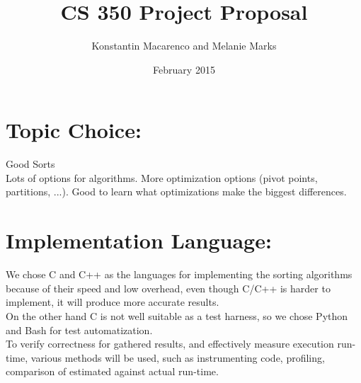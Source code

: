 \documentclass{article}
\title{CS 350 Project Proposal}
\author{Konstantin Macarenco and Melanie Marks }
\date{February 2015}
\begin{document}
\maketitle


%


\noindent
\section*{Topic Choice:}

Good Sorts\\
Lots of options for algorithms. More optimization options (pivot points, partitions, ...).  Good to learn what optimizations make the biggest differences.\\
\section*{Implementation Language:}

We chose C and C++ as the languages for implementing the sorting algorithms because of their speed and low overhead, even though C/C++ is harder to implement, it will produce more accurate results. \\
On the other hand C is not well suitable as a test harness, so we chose Python and Bash for test automatization.\\

To verify correctness for gathered results, and effectively measure execution run-time, various methods will be used, such as instrumenting code, profiling, comparison of estimated against actual run-time.\\ 
\end{document}
